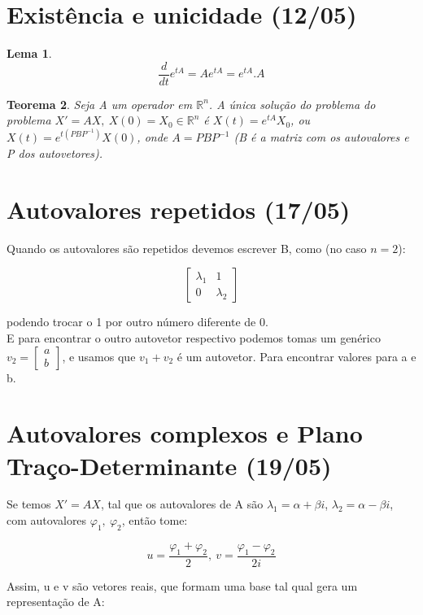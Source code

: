 \documentclass[12pt]{article}
\newtheorem{theorem}{Teorema}[section]
\newtheorem{lemma}[theorem]{Lema}
\begin{document}
\section{Existência e unicidade (12/05)}

\begin{lemma}
    $$\dfrac{d}{d t} e^{t A} = A e^{t A} = e^{t A} . A$$
\end{lemma}

\begin{theorem}
    Seja A um operador em $\mathbb{R}^n$. A única solução do problema do problema $X' = A X, \ X(0) = X_0 \in \mathbb{R}^n$ é $X(t) = e^{tA} X_0$, ou $X(t) = e^{t (P B P^{-1})} X(0)$, onde $A = P B P^{-1}$ (B é a matriz com os autovalores e P dos autovetores).
\end{theorem}

\section{Autovalores repetidos (17/05)}
Quando os autovalores são repetidos devemos escrever B, como (no caso $n = 2$):

$$
\left [
\begin{array}{cc}
    \lambda_1 & 1 \\
    0 & \lambda_2
\end{array}
\right ]
$$

podendo trocar o 1 por outro número diferente de 0.\\

E para encontrar o outro autovetor respectivo podemos tomas um genérico $v_2 = \left [ \begin{array}{c}
     a \\
     b
\end{array}
\right ]$, e usamos que $v_1 + v_2$ é um autovetor. Para encontrar valores para a e b.

\section{Autovalores complexos e Plano Traço-Determinante (19/05)}
Se temos $X' = AX$, tal que os autovalores de A são $\lambda_1 = \alpha + \beta i$, $\lambda_2 = \alpha - \beta i$, com autovalores $\varphi_1, \ \varphi_2$, então tome:

$$u = \frac{\varphi_1 + \varphi_2}{2}, \ v = \frac{\varphi_1 - \varphi_2}{2 i}$$

Assim, u e v são vetores reais, que formam uma base tal qual gera um representação de A:
\end{document}
